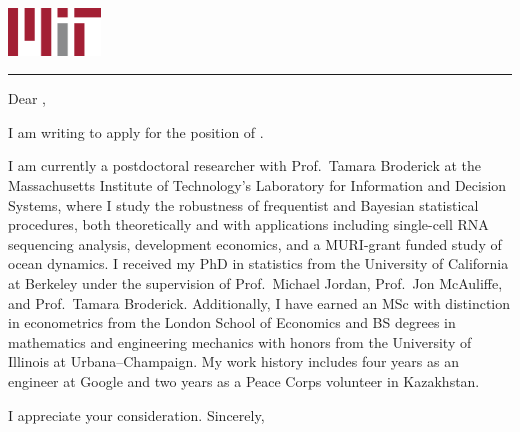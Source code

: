 




\begin{minipage}[t]{0.8\textwidth}
    \date \\ \\
    \address
    \vspace{1em}
\end{minipage}
\begin{minipage}[t]{0.2\textwidth}
    \hspace{2in} \includegraphics[height=0.5in]{static_images/1280px-MIT_logo.svg.png}
    \vspace{1em}
\end{minipage}
\noindent\textcolor{mitred}{\rule{\textwidth}{1mm}}

\vspace{3em}
Dear \whom,

\vspace{1em}
I am writing to apply for the position of \position.

\vspace{1em} I am currently a postdoctoral researcher with Prof.\ Tamara
Broderick at the Massachusetts Institute of Technology's Laboratory for
Information and Decision Systems, where I study the robustness of frequentist
and Bayesian statistical procedures, both theoretically and with applications
including single-cell RNA sequencing analysis, development economics, and a
MURI-grant funded study of ocean dynamics.  I received my PhD in
statistics from the University of California at Berkeley under the supervision
of Prof.\ Michael Jordan, Prof.\ Jon McAuliffe, and Prof.\ Tamara Broderick.
Additionally, I have earned an MSc with distinction in econometrics from the
London School of Economics and BS degrees in mathematics and engineering
mechanics with honors from the University of Illinois at Urbana--Champaign.
My work history includes four years as an engineer at Google and two
years as a Peace Corps volunteer in Kazakhstan.

\vspace{1em}
\deptspecific

\vspace{2em} I appreciate your consideration.  Sincerely,

